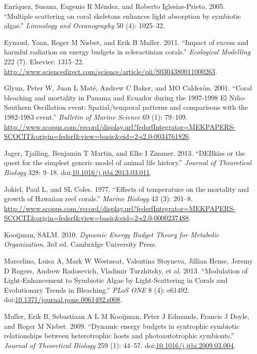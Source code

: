 \documentclass[]{elsarticle} %
\begin{document}
\hypertarget{ref-Enriquez:2005p142}{}
Enríquez, Susana, Eugenio R Méndez, and Roberto Iglesias-Prieto. 2005.
``Multiple scattering on coral skeletons enhances light absorption by
symbiotic algae.'' \emph{Limnology and Oceanography} 50 (4): 1025--32.

\hypertarget{ref-Eynaud:2011tv}{}
Eynaud, Yoan, Roger M Nisbet, and Erik B Muller. 2011. ``Impact of
excess and harmful radiation on energy budgets in scleractinian
corals.'' \emph{Ecological Modelling} 222 (7). Elsevier: 1315--22.
\url{http://www.sciencedirect.com/science/article/pii/S0304380011000263}.

\hypertarget{ref-Glynn:2001p7571}{}
Glynn, Peter W, Juan L Maté, Andrew C Baker, and MO Calderón. 2001.
``Coral bleaching and mortality in Panama and Ecuador during the
1997-1998 El Niño-Southern Oscillation event: Spatial/temporal patterns
and comparisons with the 1982-1983 event.'' \emph{Bulletin of Marine
Science} 69 (1): 79--109.
\url{http://www.scopus.com/record/display.url?fedsrfIntegrator=MEKPAPERS-SCOCIT\&origin=fedsrf\&view=basic\&eid=2-s2.0-0034761826}.

\hypertarget{ref-Jager:2013bj}{}
Jager, Tjalling, Benjamin T Martin, and Elke I Zimmer. 2013. ``DEBkiss
or the quest for the simplest generic model of animal life history.''
\emph{Journal of Theoretical Biology} 328: 9--18.
doi:\href{https://doi.org/10.1016/j.jtbi.2013.03.011}{10.1016/j.jtbi.2013.03.011}.

\hypertarget{ref-Jokiel:1977p7353}{}
Jokiel, Paul L, and SL Coles. 1977. ``Effects of temperature on the
mortality and growth of Hawaiian reef corals.'' \emph{Marine Biology} 43
(3): 201--8.
\url{http://www.scopus.com/record/display.url?fedsrfIntegrator=MEKPAPERS-SCOCIT\&origin=fedsrf\&view=basic\&eid=2-s2.0-0000237488}.

\hypertarget{ref-Kooijman:2010vd}{}
Kooijman, SALM. 2010. \emph{Dynamic Energy Budget Theory for Metabolic
Organization}. 3rd ed. Cambridge University Press.

\hypertarget{ref-Marcelino:2013hz}{}
Marcelino, Luisa A, Mark W Westneat, Valentina Stoyneva, Jillian Henss,
Jeremy D Rogers, Andrew Radosevich, Vladimir Turzhitsky, et al. 2013.
``Modulation of Light-Enhancement to Symbiotic Algae by Light-Scattering
in Corals and Evolutionary Trends in Bleaching.'' \emph{PLoS ONE} 8 (4):
e61492.
doi:\href{https://doi.org/10.1371/journal.pone.0061492.s008}{10.1371/journal.pone.0061492.s008}.

\hypertarget{ref-Muller:2009io}{}
Muller, Erik B, Sebastiaan A L M Kooijman, Peter J Edmunds, Francis J
Doyle, and Roger M Nisbet. 2009. ``Dynamic energy budgets in syntrophic
symbiotic relationships between heterotrophic hosts and photoautotrophic
symbionts.'' \emph{Journal of Theoretical Biology} 259 (1): 44--57.
doi:\href{https://doi.org/10.1016/j.jtbi.2009.03.004}{10.1016/j.jtbi.2009.03.004}.
\end{document}
